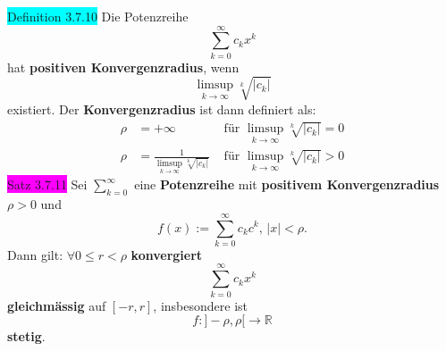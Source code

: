 \documentclass[landscape, 10pt]{article}
\newcommand{\R}{\mathbb{R}}
\begin{document}
\begin{multicols}{3}
              \colorbox{cyan}{Definition 3.7.10} 
                     Die Potenzreihe 
                     \begin{equation*}
                            \sum_{k=0}^\infty c_kx^k
                     \end{equation*}
                     hat \textbf{positiven Konvergenzradius}, 
                     wenn 
                     \begin{equation*}
                            \limsup\limits_{k\to\infty}\sqrt[k]{|c_k|}
                     \end{equation*}
                     existiert. 
                     Der \textbf{Konvergenzradius} 
                     ist dann definiert als: 
                     \begin{align*}
                            \rho&=+\infty 
                            &\text{ für } 
                            \limsup\limits_{k\to\infty}
                            \sqrt[k]{|c_k|}=0 \\
                            \rho&=\frac{1}{\limsup
                            \limits_{k\to\infty}\sqrt[k]{|c_k|}}
                            &\text{ für }
                            \limsup\limits_{k\to\infty}
                            \sqrt[k]{|c_k|}>0
                     \end{align*}
              \colorbox{magenta}{Satz 3.7.11} 
                     Sei \textcolor{NavyBlue}{
                     $\sum_{k=0}^\infty$}
                     eine \textbf{Potenzreihe} mit 
                     \textbf{positivem Konvergenzradius} 
                     \textcolor{NavyBlue}{$\rho>0$} und 
                     \begin{equation*}
                            f(x):=\sum_{k=0}^\infty 
                            c_kc^k,\,|x|<\rho.
                     \end{equation*}
                     Dann gilt: 
                     \textcolor{NavyBlue}{
                     $\forall0\leqslant r<\rho$} 
                     \textbf{konvergiert} 
                     \begin{equation*}
                         \sum_{k=0}^\infty c_kx^k   
                     \end{equation*}
                     \textbf{gleichmässig} auf 
                     \textcolor{NavyBlue}{$[-r,r]$}, 
                     insbesondere ist 
                     \begin{equation*}
                         f:]-\rho,\rho[\longrightarrow\R   
                     \end{equation*}
                     \textbf{stetig}.

\end{multicols}
\end{document}
